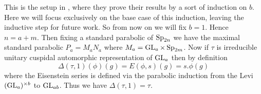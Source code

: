 This is the setup in \cite{jiangPolesCertainResidual2013}, where they prove their results by a sort of induction on \(b\). Here we will focus exclusively on the base case of this induction, leaving the inductive step for future work. So from now on we will fix \(b = 1\). Hence \(n = a + m\). Then fixing a standard parabolic of \(\operatorname{Sp}_{2n}\) we have the maximal standard parabolic \(P_a = M_aN_a\) where \(M_a = \operatorname{GL}_a \times \operatorname{Sp}_{2m}\).  Now if \(\tau\) is irreducible unitary cuspidal automorphic representation of \(\operatorname{GL}_a\) then by definition 
\[\Delta(\tau, 1)(\phi)(g) = E(\phi,s)(g) = s.\phi(g)\]
where the Eisenstein series is defined via the parabolic induction from the Levi \((\operatorname{GL}_a)^{\times b} \) to \(\operatorname{GL}_{ab}\). Thus we have \(\Delta(\tau, 1) = \tau\).


\begin{comment}
    \section{Our Results}
We consider an almost identical setup but we deal with the metaplectic cover of \(\Sp_{2n}\), again over a number field \(F\), \(\Mp_{2n}\)\todo[inline]{reference the section I discuss this in.}. We again fix the Borel of upper triangular matricies, consider partitions of \(n = r+m\) and look at maximal standard parabolics of \(\Sp_{2n}\), \(P_r = M_rN_r\) such that 
\[M_r = \GL_r \times \Sp_{2m}\]
then if \(r = ab\) we still have that \(\Delta(\tau, b)\tensor \sigma\), for \(\tau\) irreducible unitary cuspidal automorphic representation of \(\GL_a\) and \(\sigma\) irreducible generic cuspidal automorphic representation of \(\Sp_{2m}\), is a representation of \(M_r\). The difference is in the parabolic induction as we now consider 
\[\phi\in \mathcal{A}(N_r(\A)M_r(F)\setminus \Mp_{2n}(\A) )_{\Delta(\tau, b)\tensor \sigma}\] 
and then the Eisenstein series is defined in the same way
\[E(\phi, s)(g) = \sum_{\gamma\in P_r(F) \setminus \Sp_{2n}(F)} s.\phi(\gamma g)\]
for \(g\in \Sp_{2n}(F) \setminus \Mp_{2n}(\A)\) and \(s\in \C \cong X^{\Mp_{2n}}_{M_r}\).

\begin{Lemma}
When \(b = 1\) we have the constant term
    \[E(\phi,s)(g)_{P_a} = \phi(g)_{P_a} + M(\omega, \tau\tensor\sigma)(\phi)(g)\]
\end{Lemma}

\todo[inline]{fill in here as theorems or whatever anything that I end up actually checking....}

\end{comment}


